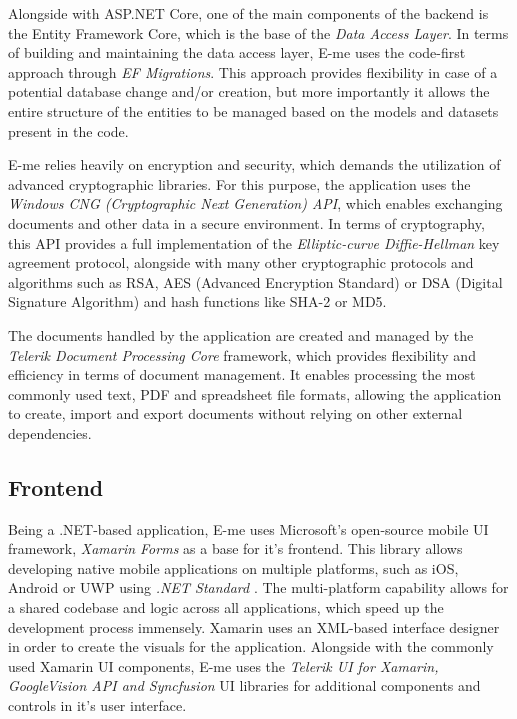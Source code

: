 Alongside with ASP.NET Core, one of the main components of the backend is the Entity Framework Core, which is the base of the 
\emph{Data Access Layer}.
In terms of building and maintaining the data access layer, E-me uses the code-first approach through \emph{EF Migrations}.
This approach provides flexibility in case of a potential database change and/or creation, but more importantly it allows 
the entire structure of the entities to be managed based on the models and datasets present in the code.

E-me relies heavily on encryption and security, which demands the utilization of advanced cryptographic libraries.
For this purpose, the application uses the \emph{Windows CNG (Cryptographic Next Generation) API}, which
enables exchanging documents and other data in a secure environment.
In terms of cryptography, this API provides a full implementation of the \emph{Elliptic-curve Diffie-Hellman} key agreement protocol,
alongside with many other cryptographic protocols and algorithms such as RSA, AES (Advanced Encryption Standard) or DSA (Digital Signature Algorithm)
and hash functions like SHA-2 or MD5.

The documents handled by the application are created and managed by the \emph{Telerik Document Processing Core} framework, which
provides flexibility and efficiency in terms of document management. 
It enables processing the most commonly used text, PDF and spreadsheet file formats, allowing the application
to create, import and export documents without relying on other external dependencies.

\subsection{Frontend}

Being a .NET-based application, E-me uses Microsoft's open-source mobile UI framework, \emph{Xamarin Forms} as a base for it's frontend.
This library allows developing native mobile applications on multiple platforms, such as iOS, Android or UWP using \emph{.NET Standard} \cite{hermes2015xamarin}. 
The multi-platform capability allows for a shared codebase and logic across all applications, which speed up the development process immensely.
Xamarin uses an XML-based interface designer in order to create the visuals for the application.
Alongside with the commonly used Xamarin UI components, E-me uses the \emph{Telerik UI for Xamarin, GoogleVision API and Syncfusion} UI
libraries for additional components and controls in it's user interface.



